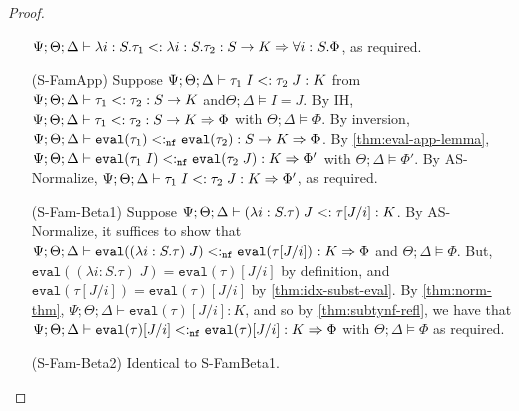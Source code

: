 \begin{proof}
\begin{itemize}
   $\Psi ; \Theta ; \Delta \vdash \lambda i : S. \tau_1 <: \lambda i : S. \tau_2 : S \to K \Rightarrow \forall i : S. \Phi$, as required.
   \item[(S-FamApp)] Suppose $\Psi ; \Theta ; \Delta \vdash \tau_1 \; I <: \tau_2 \; J : K$ from $\Psi ; \Theta ; \Delta \vdash \tau_1 <: \tau_2 : S \to K$ and$\Theta ; \Delta \vDash I = J$. By IH,  $\Psi ; \Theta ; \Delta \vdash \tau_1 <: \tau_2 : S \to K \Rightarrow \Phi$ with $\Theta ; \Delta \vDash \Phi$. By inversion, $\Psi ; \Theta ; \Delta \vdash \texttt{eval}(\tau_1) <:_{\texttt{nf}} \texttt{eval}(\tau_2) : S \to K \Rightarrow \Phi$. By \autoref{thm:eval-app-lemma},
   $\Psi ; \Theta ; \Delta \vdash \texttt{eval}(\tau_1 \; I) <:_{\texttt{nf}} \texttt{eval}(\tau_2 \; J) : K \Rightarrow \Phi'$ with $\Theta ; \Delta \vDash \Phi'$.
   By AS-Normalize, $\Psi ; \Theta ; \Delta \vdash \tau_1 \; I <: \tau_2 \; J : K \Rightarrow \Phi'$, as required.
   
   \item[(S-Fam-Beta1)] Suppose $\Psi ; \Theta ; \Delta \vdash (\lambda i : S. \tau) \; J <: \tau[J/i] : K$. By AS-Normalize, it suffices to show that
   $\Psi ; \Theta ; \Delta \vdash \texttt{eval}((\lambda i : S. \tau) \; J) <:_{\texttt{nf}} \texttt{eval}(\tau[J/i]) : K \Rightarrow \Phi$ and $\Theta ; \Delta \vDash \Phi$.
   But, $\texttt{eval}((\lambda i : S. \tau) \; J) = \texttt{eval}(\tau)[J/i]$ by definition, and $\texttt{eval}(\tau[J/i]) = \texttt{eval}(\tau)[J/i]$ by \autoref{thm:idx-subst-eval}. By \autoref{thm:norm-thm},  $\Psi ; \Theta ; \Delta \vdash \texttt{eval}(\tau)[J/i] : K$, and so by \autoref{thm:subtynf-refl}, we have that $\Psi ; \Theta ; \Delta \vdash \texttt{eval}(\tau)[J/i] <:_{\texttt{nf}} \texttt{eval}(\tau)[J/i] : K \Rightarrow \Phi$ with $\Theta ; \Delta \vDash \Phi$ as required.
   \item[(S-Fam-Beta2)] Identical to S-FamBeta1.
 \end{itemize}
\end{proof}